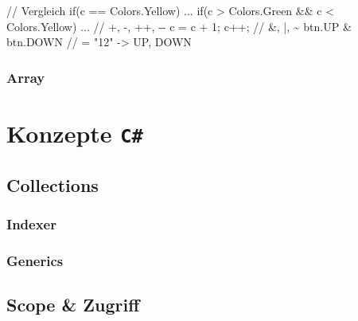 \documentclass[
  9pt,
  a4paperpaper,
  DIV=11]{scrartcl}
\newenvironment{Shaded}{}{}
\newcommand{\CommentTok}[1]{\textcolor[rgb]{0.42,0.45,0.49}{#1}}
\newcommand{\DecValTok}[1]{\textcolor[rgb]{0.00,0.36,0.77}{#1}}
\newcommand{\FunctionTok}[1]{\textcolor[rgb]{0.44,0.26,0.76}{#1}}
\newcommand{\KeywordTok}[1]{\textcolor[rgb]{0.84,0.23,0.29}{#1}}
\newcommand{\NormalTok}[1]{\textcolor[rgb]{0.14,0.16,0.18}{#1}}
\newcommand{\OperatorTok}[1]{\textcolor[rgb]{0.14,0.16,0.18}{#1}}
\numberwithin{equation}{section}
\begin{document}
\begin{multicols}{2}
\begin{tcolorbox}
\begin{tcolorbox}
\begin{tcolorbox}
\begin{tcolorbox}
\begin{tcolorbox}
\begin{Shaded}
\begin{Highlighting}[]
\CommentTok{// Vergleich}
  \KeywordTok{if}\OperatorTok{(}\NormalTok{c }\OperatorTok{==}\NormalTok{ Colors}\OperatorTok{.}\FunctionTok{Yellow}\OperatorTok{)} \OperatorTok{...}                    
  \KeywordTok{if}\OperatorTok{(}\NormalTok{c }\OperatorTok{\textgreater{}}\NormalTok{ Colors}\OperatorTok{.}\FunctionTok{Green} \OperatorTok{\&\&}\NormalTok{ c }\OperatorTok{\textless{}}\NormalTok{ Colors}\OperatorTok{.}\FunctionTok{Yellow}\OperatorTok{)} \OperatorTok{...}
\CommentTok{// +, {-}, ++, {-}{-}}
\NormalTok{  c }\OperatorTok{=}\NormalTok{ c }\OperatorTok{+} \DecValTok{1}\OperatorTok{;}\NormalTok{    c}\OperatorTok{++;}                                
\CommentTok{// \&, |, \textasciitilde{}}
\NormalTok{  btn}\OperatorTok{.}\FunctionTok{UP} \OperatorTok{\&}\NormalTok{ btn}\OperatorTok{.}\FunctionTok{DOWN}  \CommentTok{// = "12" {-}\textgreater{} UP, DOWN      }
\end{Highlighting}
\end{Shaded}

\hypertarget{array}{%
\subsubsection{Array}\label{array}}

\hypertarget{konzepte-c}{%
\section{\texorpdfstring{Konzepte
\texttt{C\#}}{Konzepte C\#}}\label{konzepte-c}}

\hypertarget{collections}{%
\subsection{Collections}\label{collections}}

\hypertarget{indexer}{%
\subsubsection{Indexer}\label{indexer}}

\hypertarget{generics}{%
\subsubsection{Generics}\label{generics}}

\hypertarget{scope-zugriff}{%
\subsection{Scope \& Zugriff}\label{scope-zugriff}}


\end{tcolorbox}
\end{tcolorbox}
\end{tcolorbox}
\end{tcolorbox}
\end{tcolorbox}
\end{multicols}
\end{document}

